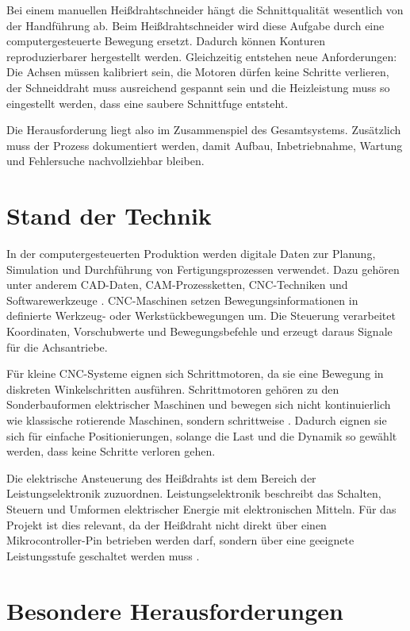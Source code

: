 Bei einem manuellen Heißdrahtschneider hängt die Schnittqualität wesentlich von der Handführung ab. Beim Heißdrahtschneider wird diese Aufgabe durch eine computergesteuerte Bewegung ersetzt. Dadurch können Konturen reproduzierbarer hergestellt werden. Gleichzeitig entstehen neue Anforderungen: Die Achsen müssen kalibriert sein, die Motoren dürfen keine Schritte verlieren, der Schneiddraht muss ausreichend gespannt sein und die Heizleistung muss so eingestellt werden, dass eine saubere Schnittfuge entsteht.

Die Herausforderung liegt also im Zusammenspiel des Gesamtsystems. Zusätzlich muss der Prozess dokumentiert werden, damit Aufbau, Inbetriebnahme, Wartung und Fehlersuche nachvollziehbar bleiben.

\section{Stand der Technik}
\label{sec:stand_der_technik}

In der computergesteuerten Produktion werden digitale Daten zur Planung, Simulation und Durchführung von Fertigungsprozessen verwendet. Dazu gehören unter anderem CAD-Daten, CAM-Prozessketten, CNC-Techniken und Softwarewerkzeuge \cite{Hehenberger:2020}. CNC-Maschinen setzen Bewegungsinformationen in definierte Werkzeug- oder Werkstückbewegungen um. Die Steuerung verarbeitet Koordinaten, Vorschubwerte und Bewegungsbefehle und erzeugt daraus Signale für die Achsantriebe.

Für kleine CNC-Systeme eignen sich Schrittmotoren, da sie eine Bewegung in diskreten Winkelschritten ausführen. Schrittmotoren gehören zu den Sonderbauformen elektrischer Maschinen und bewegen sich nicht kontinuierlich wie klassische rotierende Maschinen, sondern schrittweise \cite{Schroeder:2017}. Dadurch eignen sie sich für einfache Positionierungen, solange die Last und die Dynamik so gewählt werden, dass keine Schritte verloren gehen.

Die elektrische Ansteuerung des Heißdrahts ist dem Bereich der Leistungselektronik zuzuordnen. Leistungselektronik beschreibt das Schalten, Steuern und Umformen elektrischer Energie mit elektronischen Mitteln. Für das Projekt ist dies relevant, da der Heißdraht nicht direkt über einen Mikrocontroller-Pin betrieben werden darf, sondern über eine geeignete Leistungsstufe geschaltet werden muss \cite{Zach:2022}.

\section{Besondere Herausforderungen}
\label{sec:besondere_herausforderungen}

